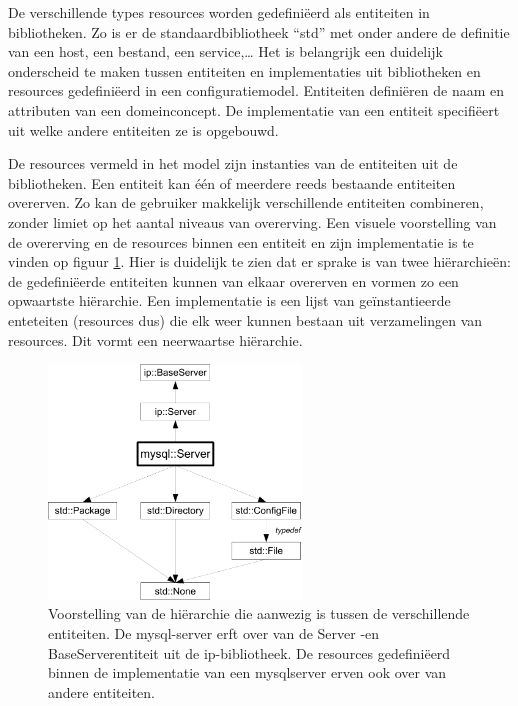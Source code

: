 De verschillende types resources worden gedefini\"eerd als entiteiten in bibliotheken. 
Zo is er de standaardbibliotheek ``std'' met onder andere de definitie van een host, een bestand, een service,\ldots
Het is belangrijk een duidelijk onderscheid te maken tussen entiteiten en implementaties uit bibliotheken en resources gedefini\"eerd in een configuratiemodel.
Entiteiten defini\"eren de naam en attributen van een domeinconcept.
De implementatie van een entiteit specifi\"eert uit welke andere entiteiten ze is opgebouwd.

De resources vermeld in het model zijn instanties van de entiteiten uit de bibliotheken.
Een entiteit kan \'e\'en of meerdere reeds bestaande entiteiten overerven.
Zo kan de gebruiker makkelijk verschillende entiteiten combineren, zonder limiet op het aantal niveaus van overerving.
Een visuele voorstelling van de overerving en de resources binnen een entiteit en zijn implementatie is te vinden op figuur \ref{fig:model_hierarchie}.
Hier is duidelijk te zien dat er sprake is van twee hi\"erarchie\"en: de gedefini\"eerde entiteiten kunnen van elkaar overerven en vormen zo een opwaartste hi\"erarchie.
Een implementatie is een lijst van ge\"instantieerde enteteiten (resources dus) die elk weer kunnen bestaan uit verzamelingen van resources.
Dit vormt een neerwaartse hi\"erarchie.

\begin{figure}[h]
    \begin{center}
    \includegraphics[width=0.6\textwidth]{images/model_hierarchie.pdf}
    \caption{Voorstelling van de hi\"erarchie die aanwezig is tussen de verschillende entiteiten.
            De mysql-server erft over van de Server -en BaseServerentiteit uit de ip-bibliotheek.
            De resources gedefini\"eerd binnen de implementatie van een mysqlserver erven ook over van andere entiteiten.}
    \label{fig:model_hierarchie}
    \end{center}
\end{figure}

